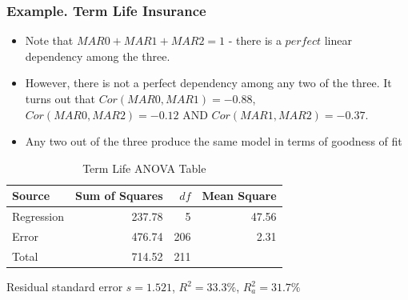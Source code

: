 \begin{frame}
 \frametitle{Example. Term Life Insurance}
  \begin{itemize}
   \item Note that $MAR0 + MAR1 + MAR2 = 1$ - there is a $perfect$
   linear dependency among the three.
   \item However, there is not a perfect dependency among any two of
   the three. It turns out that $Cor(MAR0,MAR1) = -0.88$, $Cor(MAR0,MAR2) =
   -0.12$ AND $Cor(MAR1,MAR2) = -0.37$.
   \item Any two out of the three produce the same model in terms of
   goodness of fit
   \end{itemize}
 \begin{table}
\caption{ Term Life ANOVA Table}
\begin{tabular}{lrrr}
 \hline Source
& Sum of Squares & $df$ & Mean Square \\ \hline

Regression & 237.78 & 5 &   47.56 \\
Error      & 476.74 & 206 &  2.31 \\
Total      & 714.52 & 211 &   \\ \hline
\end{tabular}

Residual standard error $s= 1.521$, $R^2 = 33.3\%$, $R_a^2 = 31.7\%$
\end{table}
\end{frame}

